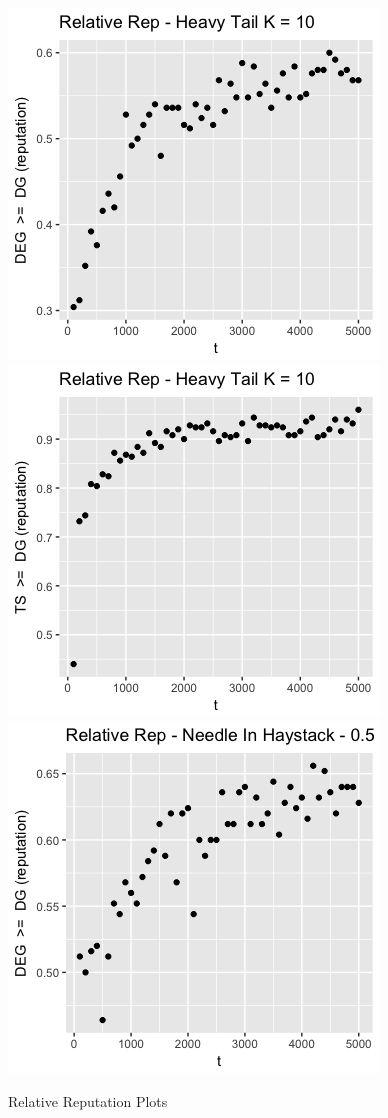 \documentclass{article}
\theoremstyle{definition}
\begin{document}
\begin{figure}
\caption{Relative Reputation Plots}
\includegraphics[scale=0.25]{"figures/deg_dg_ht_10_prelim"}
\includegraphics[scale=0.25]{"figures/ts_dg_ht_10_prelim"} \\
\includegraphics[scale=0.25]{"figures/deg_dg_nih_10_prelim"}

\end{figure}
\end{document}
